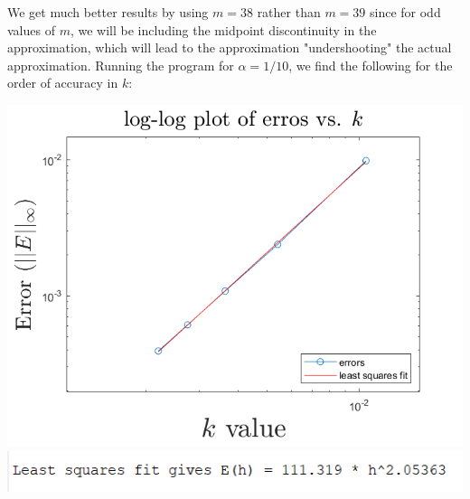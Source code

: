 \documentclass{article}
\begin{document}
\begin{itemize}
\begin{itemize}
        We get much better results by using $m = 38$ rather than $m = 39$ since for odd values of $m$, we will be including the midpoint discontinuity in the approximation, which will lead to the approximation "undershooting" the actual approximation.
        \newline
        Running the program for $\alpha = 1/10$, we find the following for the order of accuracy in $k$:
        \begin{center}
            \includegraphics[scale = 0.6]{93errork.png}
            \newline
            \includegraphics[scale = 0.8]{orderink.PNG}
        \end{center}
        

\end{itemize}
\end{itemize}
\end{document}
